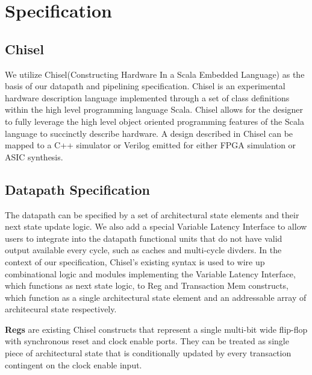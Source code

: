 \section{Specification}

\subsection{Chisel}
We utilize Chisel(Constructing Hardware In a Scala Embedded Language) as the basis of our datapath and pipelining specification. Chisel is an experimental hardware description language implemented through a set of class definitions within the high level programming language Scala. Chisel allows for the designer to fully leverage the high level object oriented programming features of the Scala language to succinctly describe hardware. A design described in Chisel can be mapped to a C++ simulator or Verilog emitted for either FPGA simulation or ASIC synthesis.
\subsection{Datapath Specification}
The datapath can be specified by a set of architectural state elements and their next state update logic. We also add a special Variable Latency Interface to allow users to integrate into the datapath functional units that do not have valid output available every cycle, such as caches and multi-cycle divders. In the context of our specification, Chisel's existing syntax is used to wire up combinational logic and modules implementing the Variable Latency Interface, which functions as next state logic, to Reg and Transaction Mem constructs, which function as a single architectural state element and an addressable array of architecural state respectively.

{\bf Regs} are existing Chisel constructs that represent a single multi-bit wide flip-flop with synchronous reset and clock enable ports. They can be treated as single piece of architectural state that is conditionally updated by every transaction contingent on the clock enable input.

